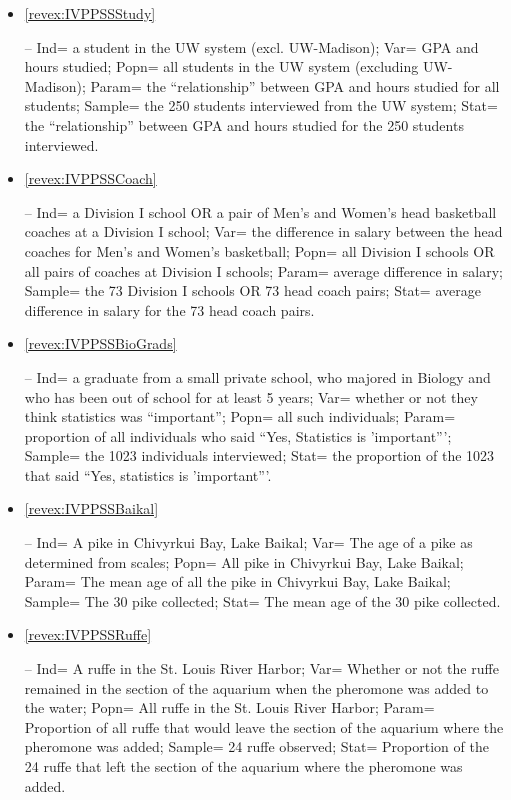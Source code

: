 \documentclass[10pt,openany]{book}\usepackage[]{graphicx}\usepackage[]{color}
\begin{document}
\begin{itemize}
  \item \hypertarget{ans:IVPPSSStudy}{\ref{revex:IVPPSSStudy}} -- Ind= a student in the UW system (excl. UW-Madison); Var= GPA and hours studied; Popn= all students in the UW system (excluding UW-Madison); Param= the ``relationship'' between GPA and hours studied for all students; Sample= the 250 students interviewed from the UW system; Stat= the ``relationship'' between GPA and hours studied for the 250 students interviewed.

  \item \hypertarget{ans:IVPPSSCoach}{\ref{revex:IVPPSSCoach}} -- Ind= a Division I school OR a pair of Men's and Women's head basketball coaches at a Division I school; Var= the difference in salary between the head coaches for Men's and Women's basketball; Popn= all Division I schools OR all pairs of coaches at Division I schools; Param= average difference in salary; Sample= the 73 Division I schools OR 73 head coach pairs; Stat= average difference in salary for the 73 head coach pairs.

  \item \hypertarget{ans:IVPPSSBioGrads}{\ref{revex:IVPPSSBioGrads}} -- Ind= a graduate from a small private school, who majored in Biology and who has been out of school for at least 5 years; Var= whether or not they think statistics was ``important''; Popn= all such individuals; Param= proportion of all individuals who said ``Yes, Statistics is 'important'''; Sample= the 1023 individuals interviewed; Stat= the proportion of the 1023 that said ``Yes, statistics is 'important'''.

  \item \hypertarget{ans:IVPPSSBaikal}{\ref{revex:IVPPSSBaikal}} -- Ind= A pike in Chivyrkui Bay, Lake Baikal; Var= The age of a pike as determined from scales; Popn= All pike in Chivyrkui Bay, Lake Baikal; Param= The mean age of all the pike in Chivyrkui Bay, Lake Baikal; Sample= The 30 pike collected; Stat= The mean age of the 30 pike collected.

  \item \hypertarget{ans:IVPPSSRuffe}{\ref{revex:IVPPSSRuffe}} -- Ind= A ruffe in the St. Louis River Harbor; Var= Whether or not the ruffe remained in the section of the aquarium when the pheromone was added to the water; Popn= All ruffe in the St. Louis River Harbor; Param= Proportion of all ruffe that would leave the section of the aquarium where the pheromone was added; Sample= 24 ruffe observed; Stat= Proportion of the 24 ruffe that left the section of the aquarium where the pheromone was added.


\end{itemize}
\end{document}
